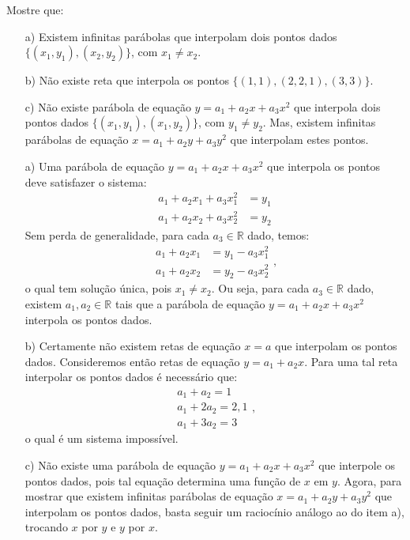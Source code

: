 \begin{exer}\label{exer:problemas_mal_determinados}
  Mostre que:
  \begin{itemize}
  \item[a)] Existem infinitas parábolas que interpolam dois pontos dados $\{(x_1, y_1), (x_2, y_2)\}$, com $x_1 \neq x_2$.
  \item[b)] Não existe reta que interpola os pontos $\{(1, 1), (2, 2,1), (3, 3)\}$.
  \item[c)] Não existe parábola de equação $y = a_1 + a_2x + a_3x^2$ que interpola dois pontos dados $\{(x_1, y_1), (x_1, y_2)\}$, com $y_1 \neq y_2$. Mas, existem infinitas parábolas de equação $x = a_1 + a_2y + a_3y^2$ que interpolam estes pontos.
  \end{itemize}
\end{exer}
\begin{resp}
  
  \begin{itemize}
  \item[a)] Uma parábola de equação $y = a_1 + a_2x + a_3x^2$ que interpola os pontos deve satisfazer o sistema:
    \begin{equation*}
      \begin{split}
      a_1 + a_2x_1 + a_3x_1^2 &= y_1\\
      a_1 + a_2x_2 + a_3x_2^2 &= y_2        
      \end{split}
    \end{equation*}
Sem perda de generalidade, para cada $a_3\in\mathbb{R}$ dado, temos:
    \begin{equation*}
      \begin{split}
      a_1 + a_2x_1  &= y_1 - a_3x_1^2\\
      a_1 + a_2x_2  &= y_2 - a_3x_2^2       
      \end{split},
    \end{equation*} 
o qual tem solução única, pois $x_1\neq x_2$. Ou seja, para cada $a_3\in\mathbb{R}$ dado, existem $a_1, a_2\in\mathbb{R}$ tais que a parábola de equação $y = a_1 + a_2x + a_3x^2$ interpola os pontos dados.
\item[b)] Certamente não existem retas de equação $x = a$ que interpolam os pontos dados. Consideremos então retas de equação $y = a_1 + a_2x$. Para uma tal reta interpolar os pontos dados é necessário que:
  \begin{equation*}
    \begin{split}
    a_1 + a_2 = 1\\
    a_1 + 2a_2 = 2,1\\
    a_1 + 3a_2 = 3      
    \end{split},
  \end{equation*}
o qual é um sistema impossível.
\item[c)] Não existe uma parábola de equação $y = a_1 + a_2x + a_3x^2$ que interpole os pontos dados, pois tal equação determina uma função de $x$ em $y$. Agora, para mostrar que existem infinitas parábolas de equação $x = a_1 + a_2y + a_3y^2$ que interpolam os pontos dados, basta seguir um raciocínio análogo ao do item a), trocando $x$ por $y$ e $y$ por $x$.
  \end{itemize}
  

\end{resp}
